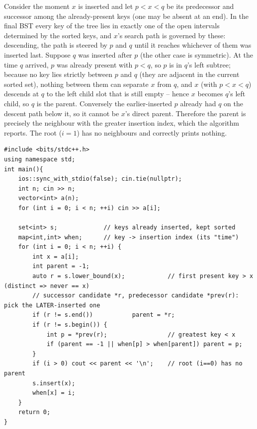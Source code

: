 \begin{proofbox}
Consider the moment $x$ is inserted and let $p<x<q$ be its predecessor and successor among the
already-present keys (one may be absent at an end). In the final BST every key of the tree lies in
exactly one of the open intervals determined by the sorted keys, and $x$'s search path is governed by
these: descending, the path is steered by $p$ and $q$ until it reaches whichever of them was inserted
last. Suppose $q$ was inserted after $p$ (the other case is symmetric). At the time $q$ arrived, $p$
was already present with $p<q$, so $p$ is in $q$'s left subtree; because no key lies strictly between
$p$ and $q$ (they are adjacent in the current sorted set), nothing between them can separate $x$ from
$q$, and $x$ (with $p<x<q$) descends at $q$ to the left child slot that is still empty -- hence $x$
becomes $q$'s left child, so $q$ is the parent. Conversely the earlier-inserted $p$ already had $q$
on the descent path below it, so it cannot be $x$'s direct parent. Therefore the parent is precisely
the neighbour with the greater insertion index, which the algorithm reports. The root ($i=1$) has no
neighbours and correctly prints nothing. \end{proofbox}

\begin{lstlisting}[caption={Tree Construction -- set-based parents without building the tree (Codeforces 675D)}, label={lst:c06-treecons-soln}]
#include <bits/stdc++.h>
using namespace std;
int main(){
    ios::sync_with_stdio(false); cin.tie(nullptr);
    int n; cin >> n;
    vector<int> a(n);
    for (int i = 0; i < n; ++i) cin >> a[i];

    set<int> s;             // keys already inserted, kept sorted
    map<int,int> when;      // key -> insertion index (its "time")
    for (int i = 0; i < n; ++i) {
        int x = a[i];
        int parent = -1;
        auto r = s.lower_bound(x);            // first present key > x (distinct => never == x)
        // successor candidate *r, predecessor candidate *prev(r): pick the LATER-inserted one
        if (r != s.end())           parent = *r;
        if (r != s.begin()) {
            int p = *prev(r);                 // greatest key < x
            if (parent == -1 || when[p] > when[parent]) parent = p;
        }
        if (i > 0) cout << parent << '\n';    // root (i==0) has no parent
        s.insert(x);
        when[x] = i;
    }
    return 0;
}
\end{lstlisting}

